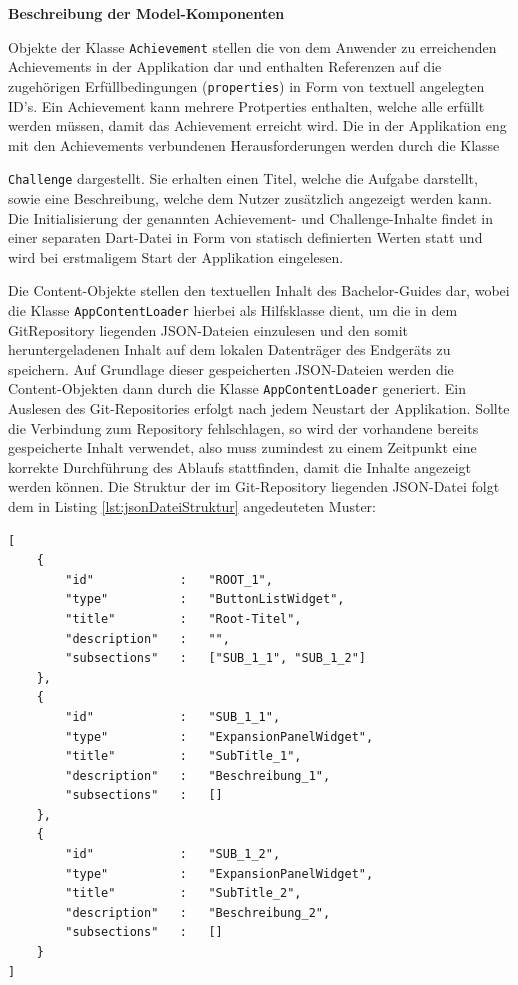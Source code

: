 \documentclass[bibliography=totoc,listof=totoc,BCOR=5mm,DIV=12,oneside]{scrbook}
\begin{document}
\par \textbf{Beschreibung der Model-Komponenten}
\par Objekte der Klasse \texttt{Achievement} stellen die von dem Anwender zu erreichenden Achievements in der Applikation dar und enthalten Referenzen auf die zugehörigen Erfüllbedingungen (\texttt{properties}) in Form von textuell angelegten ID's. Ein Achievement kann mehrere Protperties enthalten, welche alle erfüllt werden müssen, damit das Achievement erreicht wird. Die in der Applikation eng mit den Achievements verbundenen Herausforderungen werden durch die Klasse {\texttt{Challenge} dargestellt. Sie erhalten einen Titel, welche die Aufgabe darstellt, sowie eine Beschreibung, welche dem Nutzer zusätzlich angezeigt werden kann. Die Initialisierung der genannten Achievement- und Challenge-Inhalte findet in einer separaten Dart-Datei in Form von statisch definierten Werten statt und wird bei erstmaligem Start der Applikation eingelesen.

\par \bigskip Die Content-Objekte stellen den textuellen Inhalt des Bachelor-Guides dar, wobei die Klasse \texttt{AppContentLoader} hierbei als Hilfsklasse dient, um die in dem GitRepository liegenden JSON-Dateien einzulesen und den somit heruntergeladenen Inhalt auf dem lokalen Datenträger des Endgeräts zu speichern. Auf Grundlage dieser gespeicherten JSON-Dateien werden die Content-Objekten dann durch die Klasse \texttt{AppContentLoader} generiert. Ein Auslesen des Git-Repositories erfolgt nach jedem Neustart der Applikation. Sollte die Verbindung zum Repository fehlschlagen, so wird der vorhandene bereits gespeicherte Inhalt verwendet, also muss zumindest zu einem Zeitpunkt eine korrekte Durchführung des Ablaufs stattfinden, damit die Inhalte angezeigt werden können. Die Struktur der im Git-Repository liegenden JSON-Datei folgt dem in Listing \ref{lst:jsonDateiStruktur} angedeuteten Muster:

\bigskip
\begin{lstlisting}[caption={Struktur: Inhalt der JSON-Datei},captionpos=b, label=lst:jsonDateiStruktur]
[
	{
		"id"			:	"ROOT_1",
		"type"			:	"ButtonListWidget",
		"title"			:	"Root-Titel",
		"description"	:	"",
		"subsections"	:	["SUB_1_1", "SUB_1_2"]
	},
	{
		"id"			:	"SUB_1_1",
		"type"			:	"ExpansionPanelWidget",
		"title"			:	"SubTitle_1",
		"description"	:	"Beschreibung_1",
		"subsections"	:	[]
	},
	{
		"id"			:	"SUB_1_2",
		"type"			:	"ExpansionPanelWidget",
		"title"			:	"SubTitle_2",
		"description"	:	"Beschreibung_2",
		"subsections"	:	[]
	}
]
\end{lstlisting}

}
\end{document}
